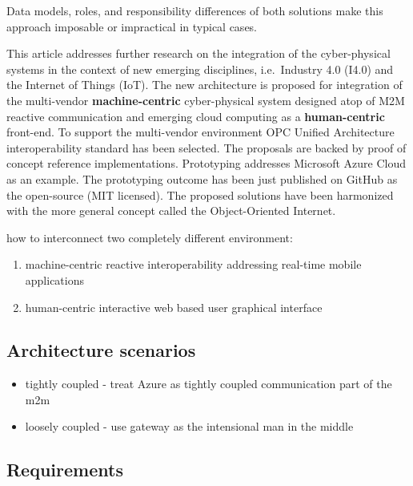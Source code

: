 \documentclass[
]{article}
\providecommand{\tightlist}{%
  \setlength{\itemsep}{0pt}\setlength{\parskip}{0pt}}
\begin{document}
Data models, roles, and responsibility differences of both solutions
make this approach imposable or impractical in typical cases.

This article addresses further research on the integration of the
cyber-physical systems in the context of new emerging disciplines,
i.e.~Industry 4.0 (I4.0) and the Internet of Things (IoT). The new
architecture is proposed for integration of the multi-vendor
\textbf{machine-centric} cyber-physical system designed atop of M2M
reactive communication and emerging cloud computing as a
\textbf{human-centric} front-end. To support the multi-vendor
environment OPC Unified Architecture interoperability standard has been
selected. The proposals are backed by proof of concept reference
implementations. Prototyping addresses Microsoft Azure Cloud as an
example. The prototyping outcome has been just published on GitHub as
the open-source (MIT licensed). The proposed solutions have been
harmonized with the more general concept called the Object-Oriented
Internet.

how to interconnect two completely different environment:

\begin{enumerate}
\def\labelenumi{\arabic{enumi}.}
\tightlist
\item
  machine-centric reactive interoperability addressing real-time mobile
  applications
\item
  human-centric interactive web based user graphical interface
\end{enumerate}

\hypertarget{architecture-scenarios}{%
\subsection{Architecture scenarios}\label{architecture-scenarios}}

\begin{itemize}
\tightlist
\item
  tightly coupled - treat Azure as tightly coupled communication part of
  the m2m
\item
  loosely coupled - use gateway as the intensional man in the middle
\end{itemize}

\hypertarget{requirements}{%
\subsection{Requirements}\label{requirements}}
\end{document}
